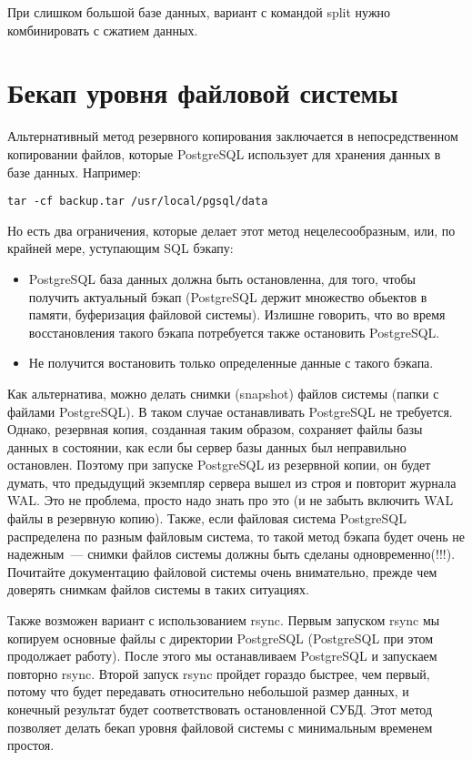При слишком большой базе данных, вариант с командой split нужно комбинировать с сжатием данных.


\section{Бекап уровня файловой системы}
Альтернативный метод резервного копирования заключается в непосредственном копировании файлов, 
которые PostgreSQL использует для хранения данных в базе данных. Например:
\begin{lstlisting}[label=lst:backups14,caption=Бэкап PostgreSQL файлов]
tar -cf backup.tar /usr/local/pgsql/data
\end{lstlisting}

Но есть два ограничения, которые делает этот метод нецелесообразным, или, по крайней мере, уступающим SQL бэкапу:
\begin{itemize}
\item PostgreSQL база данных должна быть остановленна, для того, чтобы получить актуальный бэкап 
(PostgreSQL держит множество обьектов в памяти, буферизация файловой системы). Излишне говорить, 
что во время восстановления такого бэкапа потребуется также остановить PostgreSQL.
\item Не получится востановить только определенные данные с такого бэкапа.
\end{itemize}

Как альтернатива, можно делать снимки (snapshot) файлов системы (папки с файлами PostgreSQL). В таком случае останавливать PostgreSQL 
не требуется. Однако, резервная копия, созданная таким образом, сохраняет файлы базы данных в состоянии, как если бы сервер базы данных 
был неправильно остановлен. Поэтому при запуске PostgreSQL из резервной копии, он будет думать, что предыдущий экземпляр 
сервера вышел из строя и повторит журнала WAL. Это не проблема, просто надо знать про это (и не забыть включить WAL файлы 
в резервную копию). Также, если файловая система PostgreSQL распределена по разным файловым система, то такой метод бэкапа 
будет очень не надежным~--- снимки файлов системы должны быть сделаны одновременно(!!!). Почитайте документацию файловой 
системы очень внимательно, прежде чем доверять снимкам файлов системы в таких ситуациях.

Также возможен вариант с использованием rsync. Первым запуском rsync мы копируем основные файлы с директории PostgreSQL 
(PostgreSQL при этом продолжает работу). После этого 
мы останавливаем PostgreSQL и запускаем повторно rsync. Второй запуск rsync пройдет гораздо быстрее, чем первый, 
потому что будет передавать относительно небольшой размер данных, 
и конечный результат будет соответствовать остановленной СУБД. 
Этот метод позволяет делать бекап уровня файловой системы с минимальным временем простоя.

